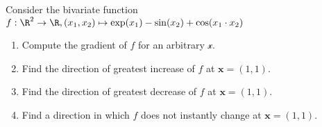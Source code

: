 Consider the bivariate function $f: \R^2 \to \R, (x_1, x_2) \mapsto \exp(x_1) - \sin(x_2) + \cos(x_1 \cdot x_2)$

%
\begin{enumerate}
	\item Compute the gradient of $f$ for an arbitrary $\mathcal{x}$.
	\item Find the direction of greatest increase of $f$ at $\mathbf{x} = (1,1).$
	\item Find the direction of greatest decrease of $f$ at $\mathbf{x} = (1,1).$	
	\item Find a direction in which $f$ does not instantly change at $\mathbf{x} = (1,1).$
		
	  
\end{enumerate}
